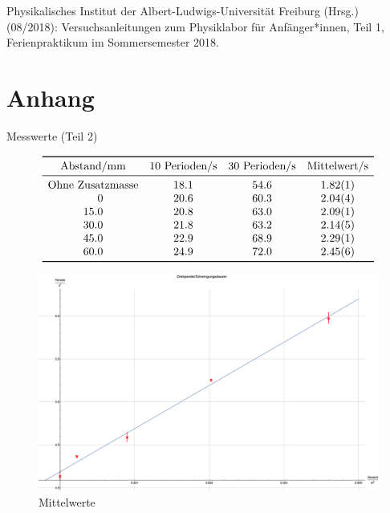 \documentclass[11pt,a4paper]{article}
\begin{document}
\vfill

\begin{thebibliography}{9}
  Physikalisches Institut der Albert-Ludwigs-Universität Freiburg (Hrsg.) (08/2018): Versuchsanleitungen zum Physiklabor für Anfänger*innen, Teil 1, Ferienpraktikum im Sommersemester 2018.
 \end{thebibliography}

\pagebreak

\section{Anhang}

\begin{table}[h]
\caption{Messwerte (Teil 2)}
$$
\begin{array}{cccc}
	\toprule 
	\textrm{Abstand/mm} & \textrm{10 Perioden/s} & \textrm{30 Perioden/s} & \textrm{Mittelwert/s}\\ 
	\midrule
	\multicolumn{1}{l}{\textrm{Ohne Zusatzmasse}} & 18.1 & 54.6 & 1.82(1)\\
	\phantom{zz.}0 & 20.6 & 60.3 & 2.04(4)\\
	15.0 & 20.8 & 63.0 & 2.09(1)\\
	30.0 & 21.8 & 63.2 & 2.14(5)\\
	45.0 & 22.9 & 68.9 & 2.29(1)\\
	60.0 & 24.9 & 72.0 & 2.45(6)\\
	\bottomrule 
\end{array}
$$
\end{table}

\begin{figure}[h]
\centering
\includegraphics[width=1\textwidth]{trick17}
\renewcommand\thefigure{B3}
\caption{Mittelwerte}
\label{t17}
\end{figure}
\end{document}
